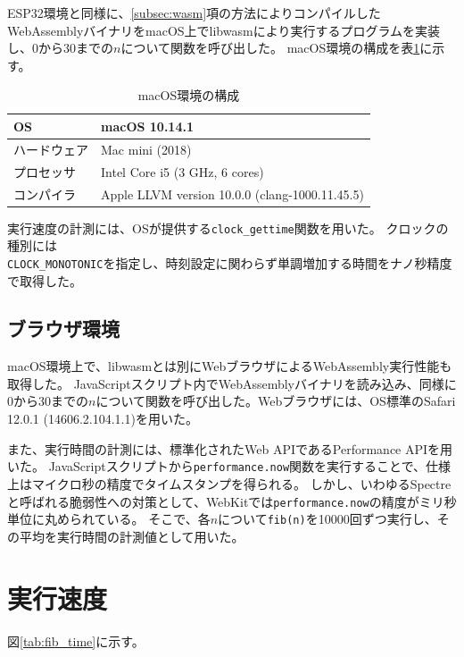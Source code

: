 ESP32環境と同様に、\ref{subsec:wasm}項の方法によりコンパイルしたWebAssemblyバイナリをmacOS上でlibwasmにより実行するプログラムを実装し、0から30までの$n$について関数を呼び出した。
macOS環境の構成を表\ref{tab:spec}に示す。

\begin{table}[htbp]
  \label{tab:spec}
  \caption{macOS環境の構成}
  \begin{center}
    \begin{tabular}{|l|l|}
    \hline
    OS & macOS 10.14.1 \\ \hline
    ハードウェア & Mac mini (2018) \\ \hline
    プロセッサ & Intel Core i5 (3 GHz, 6 cores) \\ \hline
    コンパイラ & Apple LLVM version 10.0.0 (clang-1000.11.45.5) \\ \hline
    \end{tabular}
  \end{center}
\end{table}

実行速度の計測には、OSが提供する\verb|clock_gettime|関数を用いた。
クロックの種別には \\
\verb|CLOCK_MONOTONIC|を指定し、時刻設定に関わらず単調増加する時間をナノ秒精度で取得した。

\subsection{ブラウザ環境}

macOS環境上で、libwasmとは別にWebブラウザによるWebAssembly実行性能も取得した。
JavaScriptスクリプト内でWebAssemblyバイナリを読み込み、同様に0から30までの$n$について関数を呼び出した。Webブラウザには、OS標準のSafari 12.0.1 (14606.2.104.1.1)を用いた。

また、実行時間の計測には、標準化されたWeb APIであるPerformance APIを用いた。
JavaScriptスクリプトから\verb|performance.now|関数を実行することで、仕様上はマイクロ秒の精度でタイムスタンプを得られる。
しかし、いわゆるSpectreと呼ばれる脆弱性への対策として、WebKitでは\verb|performance.now|の精度がミリ秒単位に丸められている\cite{webkit_spectre}\cite{webkit_trac}。
そこで、各$n$について\verb|fib(n)|を10000回ずつ実行し、その平均を実行時間の計測値として用いた。

\section{実行速度}

図\ref{tab:fib_time}に示す。


